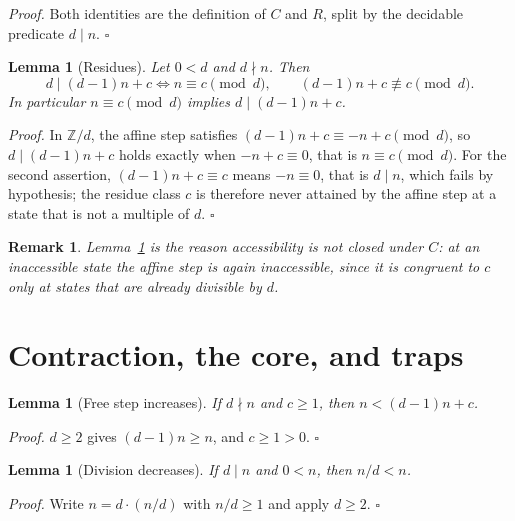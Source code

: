 \documentclass[11pt,letterpaper]{article}
\newtheorem{lemma}[theorem]{Lemma}
\newtheorem{remark}[theorem]{Remark}
\newenvironment{proof}{\noindent\textit{Proof.}}{\hfill\(\square\)}
\begin{document}
\begin{proof}
Both identities are the definition of \(C\) and \(R\), split by the
decidable predicate \(d\mid n\).
\end{proof}

\begin{lemma}[Residues]\label{Lem:Residues}
Let \(0<d\) and \(d\nmid n\). Then
\[
 d\mid (d-1)n+c \iff n\equiv c \pmod d ,
 \qquad
 (d-1)n+c\not\equiv c \pmod d .
\]
In particular \(n\equiv c\pmod d\) implies \(d\mid(d-1)n+c\).
\end{lemma}

\begin{proof}
In \(\mathbb{Z}/d\), the affine step satisfies
\((d-1)n+c\equiv -n+c\pmod d\), so \(d\mid(d-1)n+c\) holds exactly when
\(-n+c\equiv0\), that is \(n\equiv c\pmod d\). For the second assertion,
\((d-1)n+c\equiv c\) means \(-n\equiv0\), that is \(d\mid n\), which fails
by hypothesis; the residue class \(c\) is therefore never attained by the
affine step at a state that is not a multiple of \(d\).
\end{proof}

\begin{remark}\label{Rem:Inaccessible}
Lemma~\ref{Lem:Residues} is the reason accessibility is not closed under
\(C\): at an inaccessible state the affine step is again inaccessible, since
it is congruent to \(c\) only at states that are already divisible by \(d\).
\end{remark}

\section{Contraction, the core, and traps}

\begin{lemma}[Free step increases]\label{Lem:Free}
If \(d\nmid n\) and \(c\ge1\), then \(n<(d-1)n+c\).
\end{lemma}

\begin{proof}
\(d\ge2\) gives \((d-1)n\ge n\), and \(c\ge1>0\).
\end{proof}

\begin{lemma}[Division decreases]\label{Lem:DivDec}
If \(d\mid n\) and \(0<n\), then \(n/d<n\).
\end{lemma}

\begin{proof}
Write \(n=d\cdot(n/d)\) with \(n/d\ge1\) and apply \(d\ge2\).
\end{proof}
\end{document}
